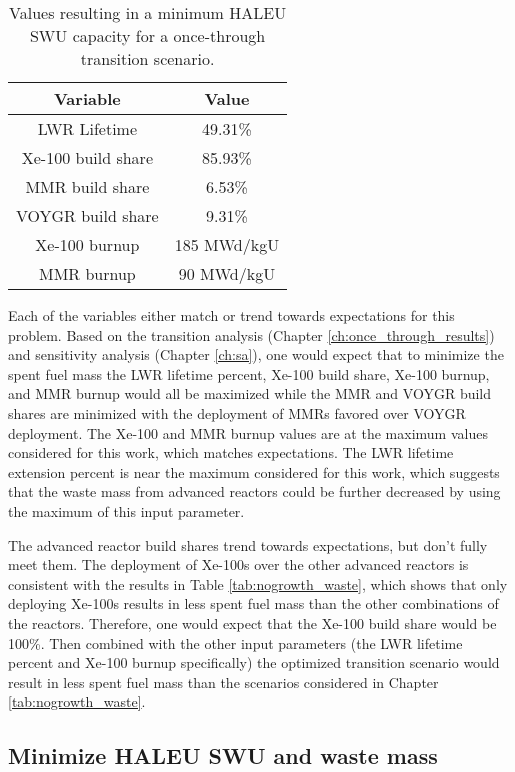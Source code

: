 \begin{table}
    \centering 
    \caption{Values resulting in a minimum \gls{HALEU} \gls{SWU} capacity for 
              a once-through transition scenario.}
    \label{tab:soga_ot_waste}
    \begin{tabular}{c c}
        \hline
        Variable & Value \\
        \hline
        LWR Lifetime & 49.31\%\\
        Xe-100 build share & 85.93\%\\
        MMR build share & 6.53\%\\
        VOYGR build share & 9.31\%\\
        Xe-100 burnup & 185 MWd/kgU\\
        MMR burnup & 90 MWd/kgU\\
        \hline
    \end{tabular}
\end{table}

Each of the variables either match or trend towards expectations for this problem. 
Based on the transition analysis (Chapter \ref{ch:once_through_results}) and 
sensitivity analysis (Chapter \ref{ch:sa}), one would expect that to minimize 
the spent fuel mass the \gls{LWR} lifetime percent, Xe-100 build share, 
Xe-100 burnup, and \gls{MMR} burnup would all be maximized while the \gls{MMR} 
and VOYGR build shares are minimized with the deployment of \glspl{MMR} favored 
over VOYGR deployment. The Xe-100 and \gls{MMR} burnup values are at the maximum 
values considered for this work, which matches expectations. The \gls{LWR} lifetime 
extension percent is near the maximum considered for this work, which suggests that 
the waste mass from advanced reactors could be further decreased by using the 
maximum of this input parameter. 

The advanced reactor build shares trend towards expectations, but don't fully 
meet them. The deployment of Xe-100s over the other advanced reactors is consistent 
with the results in Table \ref{tab:nogrowth_waste}, which shows that only deploying 
Xe-100s results in less spent fuel mass than the other combinations of the reactors. 
Therefore, one would expect that the Xe-100 build share would be 100\%. Then combined 
with the other input parameters (the \gls{LWR} lifetime percent and Xe-100 burnup 
specifically) the optimized transition scenario would result in less spent fuel 
mass than the scenarios considered in Chapter \ref{tab:nogrowth_waste}.

\subsection{Minimize HALEU SWU and waste mass}

